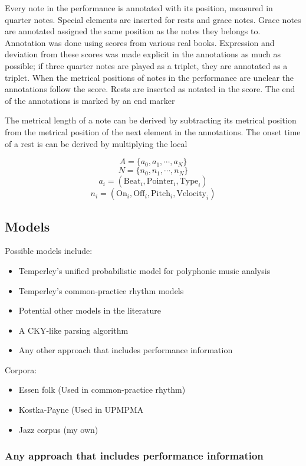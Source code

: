\documentclass[a4paper,10pt]{article}
\begin{document}
Every note in the performance is annotated with its position, measured in quarter notes. Special elements are inserted for rests and grace notes. Grace notes are annotated assigned the same position as the notes they belongs to. Annotation was done using scores from various real books. Expression and deviation from these scores was made explicit in the annotations as much as possible; if three quarter notes are played as a triplet, they are annotated as a triplet. When the metrical positions of notes in the performance are unclear the annotations follow the score. Rests are inserted as notated in the score. The end of the annotations is marked by an end marker

The metrical length of a note can be derived by subtracting its metrical position from the metrical position of the next element in the annotations. The onset time of a rest is can be derived by multiplying the local 

\[A = \{a_0, a_1, \cdots, a_N\}\]
\[N = \{n_0, n_1, \cdots, n_N\}\]
\[a_i = (\mathrm{Beat}_i, \mathrm{Pointer}_i, \mathrm{Type}_i)\]
\[n_i = (\mathrm{On}_i, \mathrm{Off}_i, \mathrm{Pitch}_i, \mathrm{Velocity}_i)\]

\subsection{Models}

Possible models include:
\begin{itemize}
\item Temperley's unified probabilistic model for polyphonic music analysis
\item Temperley's common-practice rhythm models
\item Potential other models in the literature
\item A CKY-like parsing algorithm 
\item Any other approach that includes performance information
\end{itemize}

Corpora:
\begin{itemize}
\item Essen folk (Used in common-practice rhythm)
\item Kostka-Payne (Used in UPMPMA
\item Jazz corpus (my own)
\end{itemize}

\subsubsection*{Any approach that includes performance information}
\end{document}

